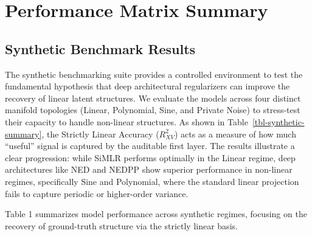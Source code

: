 \documentclass[
  letterpaper,
]{report}
\begin{document}
\section{Performance Matrix Summary}\label{performance-matrix-summary}

\subsection{Synthetic Benchmark
Results}\label{synthetic-benchmark-results}

The synthetic benchmarking suite provides a controlled environment to
test the fundamental hypothesis that deep architectural regularizers can
improve the recovery of linear latent structures. We evaluate the models
across four distinct manifold topologies (Linear, Polynomial, Sine, and
Private Noise) to stress-test their capacity to handle non-linear
structures. As shown in Table~\ref{tbl-synthetic-summary}, the Strictly
Linear Accuracy (\(R^2_{XV}\)) acts as a measure of how much ``useful''
signal is captured by the auditable first layer. The results illustrate
a clear progression: while SiMLR performs optimally in the Linear
regime, deep architectures like NED and NEDPP show superior performance
in non-linear regimes, specifically Sine and Polynomial, where the
standard linear projection fails to capture periodic or higher-order
variance.

Table 1 summarizes model performance across synthetic regimes, focusing
on the recovery of ground-truth structure via the strictly linear basis.
\end{document}
